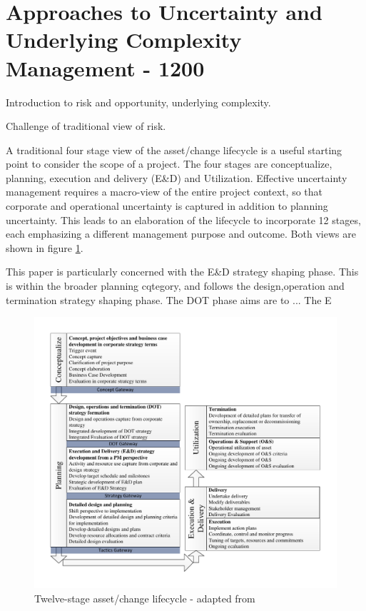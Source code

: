 
\section{Approaches to Uncertainty and Underlying Complexity Management - 1200}

Introduction to risk and opportunity, underlying complexity. 

Challenge of traditional view of risk.

A traditional four stage view of the asset/change lifecycle is a useful starting point to consider the scope of a project.
The four stages are conceptualize, planning, execution and delivery (E\&D) and Utilization.
Effective uncertainty management requires a macro-view of the entire project context, so that corporate and operational uncertainty is captured in addition to planning uncertainty.
This leads to an elaboration of the lifecycle to incorporate 12 stages, each emphasizing a different management purpose and outcome.
Both views are shown in figure \ref{Figure:Project_Lifecycle}.

This paper is particularly concerned with the E\&D strategy shaping phase.
This is within the broader planning cqtegory, and follows the design,operation and termination strategy shaping phase.
The DOT phase aims are to ...
The E\



\begin{figure}[!h]
  \centering
    \includegraphics[width = \textwidth]{./Figures/ProjectLifecycleDetailedCurve.pdf} 
\caption{Twelve-stage asset/change lifecycle - adapted from \cite{chapman}}
\label{Figure:Project_Lifecycle}
\end{figure}

